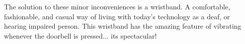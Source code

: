 The solution to these minor inconveniences is a wristband. A comfortable, fashionable, and casual way of living with today's technology as a deaf, or hearing impaired person. This wristband has the amazing feature of vibrating whenever the doorbell is pressed... its spectacular! 
